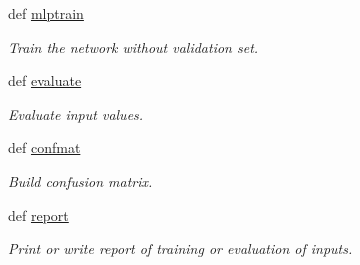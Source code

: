 \begin{DoxyCompactItemize}
def \hyperlink{classmlp_1_1mlp_a494984c787706714539fe8f1d78efa30}{mlptrain}
\begin{DoxyCompactList}\small\item\em Train the network without validation set. \item\end{DoxyCompactList}\item 
def \hyperlink{classmlp_1_1mlp_af0925b47c421fbaeaa96dc90b0f9b6d5}{evaluate}
\begin{DoxyCompactList}\small\item\em Evaluate input values. \item\end{DoxyCompactList}\item 
def \hyperlink{classmlp_1_1mlp_a809353450c250aa532e07119c4a731ee}{confmat}
\begin{DoxyCompactList}\small\item\em Build confusion matrix. \item\end{DoxyCompactList}\item 
def \hyperlink{classmlp_1_1mlp_ad5d52821223492fb389df89622053965}{report}
\begin{DoxyCompactList}\small\item\em Print or write report of training or evaluation of inputs. \item\end{DoxyCompactList}\end{DoxyCompactItemize}
